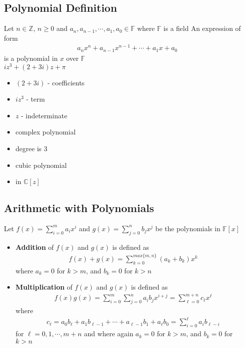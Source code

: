 \documentclass[12pt, letterpaper]{article}
\begin{document}
\subsection{Polynomial Definition}
Let $n \in \mathbb{Z}$, $n \geq 0$ and $a_n, a_{n-1}, \cdots, a_1, a_0 \in \mathbb{F}$ where $\mathbb{F}$ is a field
An expression of form 
\begin{align*}
    a_n x^n + a_{n-1} x^{n-1} + \cdots + a_1 x + a_0
\end{align*}
is a polynomial in $x$ over $\mathbb{F}$ \\
$iz^3 + (2+3i)z + \pi$
\begin{itemize}
    \item $(2+3i)$ - coefficients
    \item $iz^3$ - term 
    \item $z$ - indeterminate
    \item complex polynomial
    \item degree is 3
    \item cubic polynomial 
    \item in $\mathbb{C}[z]$
\end{itemize}
\subsection{Arithmetic with Polynomials}
Let $f(x) = \sum_{i=0}^{m} a_i x^i$ and $g(x) = \sum_{j=0}^{n} b_j x^j$ be the polynomials in $\mathbb{F}[x]$
\begin{itemize}
    \item \textbf{Addition} of $f(x)$ and $g(x)$ is defined as 
        \begin{align*}
            f(x) + g(x) = \sum_{k=0}^{max\{m,n\}} (a_k + b_k)x^k
        \end{align*}
    where $a_k = 0$ for $k > m$, and $b_k = 0$ for $k > n$ 
    \item \textbf{Multiplication} of $f(x)$ and $g(x)$ is defined as 
    \begin{align*}
        f(x)g(x) = \sum_{i=0}^{m} \sum_{j=0}^{n} a_i b_j x^{i+j} = \sum_{\ell = 0}^{m+n} c_{\ell} x^{\ell}
    \end{align*}
    where 
    \begin{align*}
        c_{\ell} = a_0b_{\ell} + a_1b_{\ell - 1} + \cdots + a_{\ell - 1}b_1 + a_{\ell}b_0 = \sum_{i=0}^{\ell} a_i b_{\ell - i}
    \end{align*}
    for $\ell = 0, 1, \cdots, m+n$ and where again $a_k=0$ for $k > m$, and $b_k = 0$ for $k > n$
\end{itemize}
\end{document}
